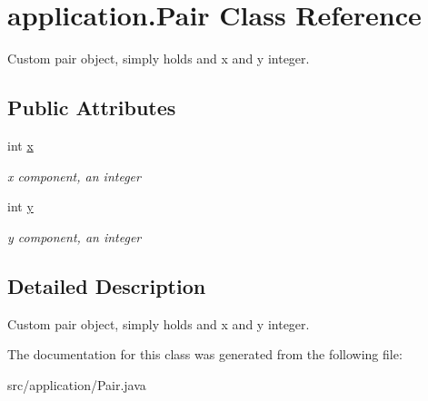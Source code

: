 \hypertarget{classapplication_1_1_pair}{\section{application.\+Pair Class Reference}
\label{classapplication_1_1_pair}
}


Custom pair object, simply holds and x and y integer.  


\subsection*{Public Attributes}
\begin{DoxyCompactItemize}
\item 
\hypertarget{classapplication_1_1_pair_af1c4cefc5c3a56acf3be3028d3be44bd}{int \hyperlink{classapplication_1_1_pair_af1c4cefc5c3a56acf3be3028d3be44bd}{x}}\label{classapplication_1_1_pair_af1c4cefc5c3a56acf3be3028d3be44bd}

\begin{DoxyCompactList}\small\item\em x component, an integer \end{DoxyCompactList}\item 
\hypertarget{classapplication_1_1_pair_a1d64330494663f25fe62a8cea5f30dc1}{int \hyperlink{classapplication_1_1_pair_a1d64330494663f25fe62a8cea5f30dc1}{y}}\label{classapplication_1_1_pair_a1d64330494663f25fe62a8cea5f30dc1}

\begin{DoxyCompactList}\small\item\em y component, an integer \end{DoxyCompactList}\end{DoxyCompactItemize}


\subsection{Detailed Description}
Custom pair object, simply holds and x and y integer. 

The documentation for this class was generated from the following file\+:\begin{DoxyCompactItemize}
\item 
src/application/Pair.\+java\end{DoxyCompactItemize}
